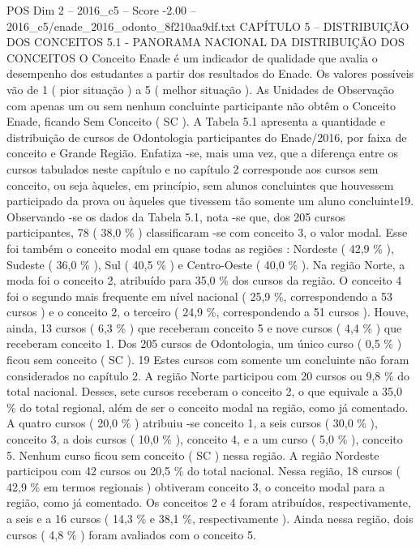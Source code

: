 \begin{textsample}{POS Dim 2 – 2016\_c5 – Score -2.00 – 2016\_c5/enade\_2016\_odonto\_8f210aa9df.txt}  \label{ex:f2_pos_400}
CAPÍTULO 5 – DISTRIBUIÇÃO DOS CONCEITOS 5.1 - PANORAMA NACIONAL DA DISTRIBUIÇÃO DOS CONCEITOS O Conceito Enade é um indicador de qualidade que avalia o desempenho dos estudantes a partir dos resultados do Enade.
Os valores possíveis vão de 1 ( pior situação ) a 5 ( melhor situação ).
As Unidades de Observação com apenas um ou sem nenhum concluinte participante não obtêm o Conceito Enade, ficando Sem Conceito ( SC ).
A Tabela 5.1 apresenta a quantidade e distribuição de cursos de Odontologia participantes do Enade/2016, por faixa de conceito e Grande Região.
Enfatiza -se, mais uma vez, que a diferença entre os cursos tabulados neste capítulo e no capítulo 2 corresponde aos cursos sem conceito, ou seja àqueles, em princípio, sem alunos concluintes que houvessem participado da prova ou àqueles que tivessem tão somente um aluno concluinte19.
Observando -se os dados da Tabela 5.1, nota -se que, dos 205 cursos participantes, 78 ( 38,0 \% ) classificaram -se com conceito 3, o valor modal.
Esse foi também o conceito modal em quase todas as regiões : Nordeste ( 42,9 \% ), Sudeste ( 36,0 \% ), Sul ( 40,5 \% ) e Centro-Oeste ( 40,0 \% ).
Na região Norte, a moda foi o conceito 2, atribuído para 35,0 \% dos cursos da região.
O conceito 4 foi o segundo mais frequente em nível nacional ( 25,9 \%, correspondendo a 53 cursos ) e o conceito 2, o terceiro ( 24,9 \%, correspondendo a 51 cursos ).
Houve, ainda, 13 cursos ( 6,3 \% ) que receberam conceito 5 e nove cursos ( 4,4 \% ) que receberam conceito 1.
Dos 205 cursos de Odontologia, um único curso ( 0,5 \% ) ficou sem conceito ( SC ). 19 Estes cursos com somente um concluinte não foram considerados no capítulo 2.
A região Norte participou com 20 cursos ou 9,8 \% do total nacional.
Desses, sete cursos receberam o conceito 2, o que equivale a 35,0 \% do total regional, além de ser o conceito modal na região, como já comentado.
A quatro cursos ( 20,0 \% ) atribuiu -se conceito 1, a seis cursos ( 30,0 \% ), conceito 3, a dois cursos ( 10,0 \% ), conceito 4, e a um curso ( 5,0 \% ), conceito 5.
Nenhum curso ficou sem conceito ( SC ) nessa região.
A região Nordeste participou com 42 cursos ou 20,5 \% do total nacional.
Nessa região, 18 cursos ( 42,9 \% em termos regionais ) obtiveram conceito 3, o conceito modal para a região, como já comentado.
Os conceitos 2 e 4 foram atribuídos, respectivamente, a seis e a 16 cursos ( 14,3 \% e 38,1 \%, respectivamente ).
Ainda nessa região, dois cursos ( 4,8 \% ) foram avaliados com o conceito 5.

\end{textsample}

